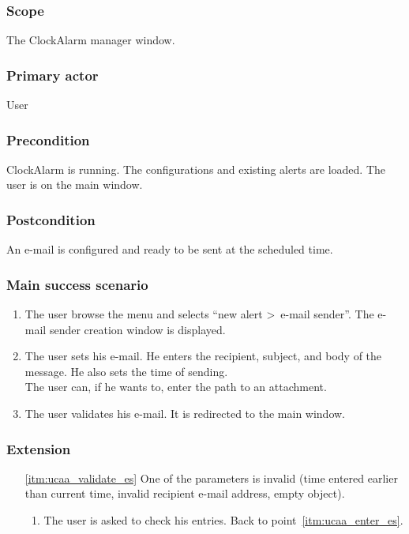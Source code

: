\subsubsection{Scope}
The ClockAlarm manager window.
\subsubsection{Primary actor}
User
\subsubsection{Precondition}
ClockAlarm is running. The configurations and existing alerts are loaded. The user is on the main window.
\subsubsection{Postcondition}
An e-mail is configured and ready to be sent at the scheduled time.
\subsubsection{Main success scenario}
\begin{enumerate}
    \item The user browse the menu and selects ``new alert \textgreater~e-mail sender''. The e-mail sender creation window is displayed. 
	\item\label{itm:ucaa_enter_es} The user sets his e-mail. He enters the recipient, subject, and body of the message. He also sets the time of sending. \\The user can, if he wants to, enter the path to an attachment.
	\item\label{itm:ucaa_validate_es} The user validates his e-mail. It is redirected to the main window.
\end{enumerate}
\subsubsection{Extension}
\begin{enumerate}
	\item[\ref{itm:ucaa_validate_es}] One of the parameters is invalid (time entered earlier than current time, invalid recipient e-mail address, empty object).
	\begin{enumerate}[i]
		\item The user is asked to check his entries. Back to point~\ref{itm:ucaa_enter_es}.
	\end{enumerate}
\end{enumerate}
